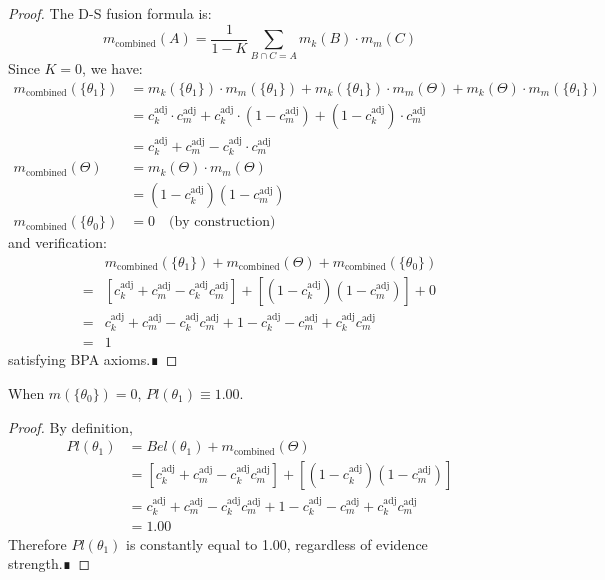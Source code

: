 \documentclass[11pt,a4paper]{report}
\begin{document}
\begin{proof}
The D-S fusion formula is:
\[
m_{\text{combined}}(A) = \frac{1}{1-K} \sum_{B \cap C = A} m_k(B) \cdot m_m(C)
\]
Since $K=0$, we have:
\[
\begin{aligned}
m_{\text{combined}}(\{\theta_1\}) &= m_k(\{\theta_1\}) \cdot m_m(\{\theta_1\}) + m_k(\{\theta_1\}) \cdot m_m(\Theta) + m_k(\Theta) \cdot m_m(\{\theta_1\}) \\
&= c_k^{\text{adj}} \cdot c_m^{\text{adj}} + c_k^{\text{adj}} \cdot (1 - c_m^{\text{adj}}) + (1 - c_k^{\text{adj}}) \cdot c_m^{\text{adj}} \\
&= c_k^{\text{adj}} + c_m^{\text{adj}} - c_k^{\text{adj}} \cdot c_m^{\text{adj}} \\
m_{\text{combined}}(\Theta) &= m_k(\Theta) \cdot m_m(\Theta) \\
&= (1 - c_k^{\text{adj}})(1 - c_m^{\text{adj}}) \\
m_{\text{combined}}(\{\theta_0\}) &= 0 \quad \text{(by construction)}
\end{aligned}
\]
and verification:
\[
\begin{aligned}
& m_{\text{combined}}(\{\theta_1\}) + m_{\text{combined}}(\Theta) + m_{\text{combined}}(\{\theta_0\}) \\
=& [c_k^{\text{adj}} + c_m^{\text{adj}} - c_k^{\text{adj}}c_m^{\text{adj}}] + [(1-c_k^{\text{adj}})(1-c_m^{\text{adj}})] + 0 \\
=& c_k^{\text{adj}} + c_m^{\text{adj}} - c_k^{\text{adj}}c_m^{\text{adj}} + 1 - c_k^{\text{adj}} - c_m^{\text{adj}} + c_k^{\text{adj}}c_m^{\text{adj}} \\
=& 1
\end{aligned}
\]
satisfying BPA axioms.∎
\end{proof}

\begin{theorem}
When $m(\{\theta_0\}) = 0$, $Pl(\theta_1) \equiv 1.00$.
\end{theorem}

\begin{proof}
By definition,
\[
\begin{aligned}
Pl(\theta_1) &= Bel(\theta_1) + m_{\text{combined}}(\Theta) \\
&= [c_k^{\text{adj}} + c_m^{\text{adj}} - c_k^{\text{adj}}c_m^{\text{adj}}] + [(1-c_k^{\text{adj}})(1-c_m^{\text{adj}})] \\
&= c_k^{\text{adj}} + c_m^{\text{adj}} - c_k^{\text{adj}}c_m^{\text{adj}} + 1 - c_k^{\text{adj}} - c_m^{\text{adj}} + c_k^{\text{adj}}c_m^{\text{adj}} \\
&= 1.00
\end{aligned}
\]
Therefore $Pl(\theta_1)$ is constantly equal to 1.00, regardless of evidence strength.∎
\end{proof}
\end{document}
